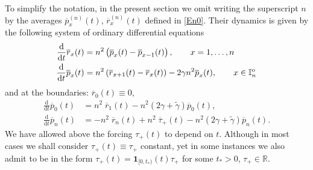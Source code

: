 \documentclass[EJP]{ejpecp} %
\newcommand\R{{\mathbb R}}
\newcommand\T{{\mathbb I}}
\newcommand{\dd  }{\mathrm{d}}
\renewcommand{\tilde}{\widetilde}
\renewcommand{\bar}{\overline}
\numberwithin{equation}{section}
\begin{document}
To simplify the notation, in the present section we omit writing the superscript $n$ by  the averages
 $\bar p_x^{(n)}(t)$, $\bar r_x^{(n)}(t)$ defined in  \eqref{En0}.
Their dynamics is given by the following system of ordinary
differential equations
 \begin{align}
 \label{eq:qdynamics-bar}
     \frac{\dd}{\dd t}  \bar  r_x(t) &= n^2 \left(\bar  p_x(t)- \bar  p_{x-1}(t)\right) ,\qquad  x=1,\ldots,n \vphantom{\Big(}\\
      \frac{\dd}{\dd t} \bar  p_x(t) &= n^2 \left(\bar  r_{x+1}(t)-
                                       \bar  r_x(t)\right)  - 2 \gamma
                                       n^2 \bar  p_x(t),\qquad x\in\T_n^{\rm o}
      \label{eq:pdyn-bar}\end{align}
  and at the boundaries: $\bar  r_0(t) \equiv0$, 
     \begin{align}
       \frac{\dd}{\dd t}  \bar   p_0(t) &= n^2 \;  \bar   r_1(t)   
      -  n^2(2\gamma+\tilde \gamma)  \bar   p_0(t) ,\label{eq:rbd-bar}\\
  \frac{\dd}{\dd t}  \bar    p_n(t) &= -n^2 \;  \bar    r_n(t)    +
                                      n^2\; \bar\tau_+(t)  -
                                      n^2(2\gamma +  \tilde \gamma)
                                      \bar    p_n(t) \label{eq:pbd-bar}.
   \end{align}
We have allowed above the forcing $\tau_+(t)$ to depend on $t$. Although in most
cases we shall consider $\tau_+(t)\equiv \tau_+$ constant, yet in some
instances we also admit to be in the form
$\tau_+(t)=\mathbf{1}_{[0,t_*)}(t)\tau_+$ for some $t_*>0$, $\tau_+\in\R$.








\end{document}
